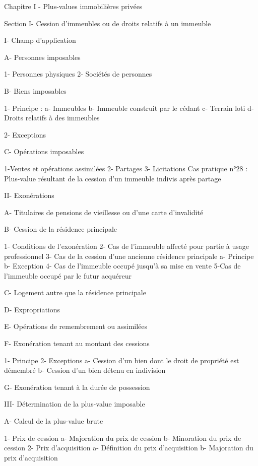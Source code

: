 Chapitre I - Plus-values immobilières privées

Section I- Cession d'immeubles ou de droits relatifs à un immeuble 

		I- Champ d'application

			A- Personnes imposables
				
1- Personnes physiques 
				2- Sociétés de personnes 
			
B- Biens imposables
				
1- Principe : 
					a- Immeubles
					b- Immeuble construit par le cédant
					c- Terrain loti
					d- Droits relatifs à des immeubles

				2- Exceptions 
		
			C- Opérations imposables
		
				1-Ventes et opérations assimilées
				2-  Partages
				3- Licitations
	Cas pratique n°28 : 	Plus-value résultant de la cession d’un immeuble indivis après partage

		II- Exonérations 

			A- Titulaires de pensions de vieillesse ou d'une carte d'invalidité
	
			B- Cession de la résidence principale
		
				1- Conditions de l'exonération
				2- Cas de l’immeuble affecté pour partie à usage professionnel
				3- Cas de la cession d’une ancienne résidence principale 
					a- Principe
					b- Exception
				4- Cas de l’immeuble occupé jusqu'à sa mise en vente
				5-Cas de l’immeuble occupé par le futur acquéreur
		
			C- Logement autre que la résidence principale
		
			D- Expropriations
		
			E- Opérations de remembrement ou assimilées
		
			F- Exonération tenant au montant des cessions
		
				1- Principe 
				2- Exceptions 
a- Cession d'un bien dont le droit de propriété est démembré
b- Cession d'un bien détenu en indivision

			G- Exonération tenant à la durée de possession

		III- Détermination de la plus-value imposable

			A- Calcul de la plus-value brute
		
				1- Prix de cession
					a- Majoration du prix de cession 
					b- Minoration du prix de cession
				2- Prix d'acquisition
					a- Définition du prix d'acquisition
					b- Majoration du prix d'acquisition
		
